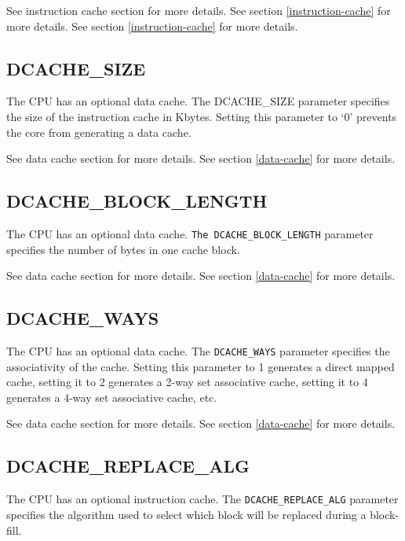 \ifdefined\MARKDOWN
See instruction cache section for more details.
\else
See section \ref{instruction-cache}  for more details.
\fi
See section \ref{instruction-cache}  for more details.

\subsection{DCACHE\_SIZE}\label{dcache_size}

The CPU has an optional data cache. The DCACHE\_SIZE parameter specifies
the size of the instruction cache in Kbytes. Setting this parameter to
`0' prevents the core from generating a data cache.

\ifdefined\MARKDOWN
See data cache section for more details.
\else
See section \ref{data-cache}  for more details.
\fi

\subsection{DCACHE\_BLOCK\_LENGTH}\label{dcache_block_length}

The CPU has an optional data cache. \texttt{The DCACHE\_BLOCK\_LENGTH} parameter
specifies the number of bytes in one cache block.

\ifdefined\MARKDOWN
See data cache section for more details.
\else
See section \ref{data-cache}  for more details.
\fi

\subsection{DCACHE\_WAYS}\label{dcache_ways}

The CPU has an optional data cache. The \texttt{DCACHE\_WAYS} parameter specifies
the associativity of the cache. Setting this parameter to 1 generates a
direct mapped cache, setting it to 2 generates a 2-way set associative
cache, setting it to 4 generates a 4-way set associative cache, etc.

\ifdefined\MARKDOWN
See data cache section for more details.
\else
See section \ref{data-cache}  for more details.
\fi

\subsection{DCACHE\_REPLACE\_ALG}\label{dcache_replace_alg}

The CPU has an optional instruction cache. The \texttt{DCACHE\_REPLACE\_ALG}
parameter specifies the algorithm used to select which block will be
replaced during a block-fill.

